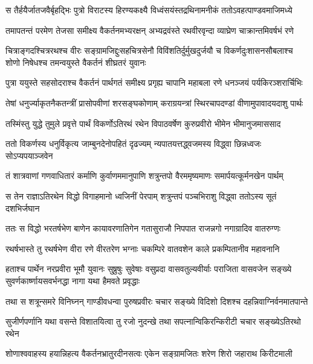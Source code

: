 
\twolineshloka
{स तैर्हयैर्जातजवैर्बृहद्भिः पुत्रो विराटस्य हिरण्यकक्ष्यै}
{विध्वंसयंस्तद्रथिनामनीकं ततोऽवहत्पाण्डवमाजिमध्ये}


\twolineshloka
{तमापतन्तं परमेण तेजसा समीक्ष्य वैकर्तनमभ्यरक्षन्}
{अभ्यद्रवंस्ते रथवीरवृन्दा व्याघ्रेण चाक्रान्तमिवर्षभं रणे}


\threelineshloka
{चित्राङ्गदश्चित्ररथश्च वीरः सङ्ग्रामजिद्दुःसहचित्रसेनौ}
{विविंशतिर्दुर्मुखदुर्जयौ च विकर्णदुःशासनसौबलाश्च}
{शोणो निषेधश्च तमन्वयुस्ते वैकर्तनं शीघ्रतरं युवानः}


\twolineshloka
{पुत्रा ययुस्ते सहसोदराश्च वैकर्तनं पार्थगतं समीक्ष्य}
{प्रगृह्य चापानि महाबला रणे धनञ्जयं पर्यकिरञ्शरार्चिभिः}


\twolineshloka
{तेषां धनुर्ज्याकृतनैकतन्त्रीं प्रासोपवीणां शरसङ्घकोणाम्}
{कराग्रयन्त्रां स्थिरचापदण्डां वीणामुपावादयदाशु पार्थः}


\twolineshloka
{तस्मिंस्तु युद्धे तुमुले प्रवृत्ते पार्थं विकर्णोऽतिरथं रथेन}
{विपाठवर्षेण कुरुप्रवीरो भीमेन भीमानुजमाससाद}


\twolineshloka
{ततो विकर्णस्य धनुर्विकृत्य जाम्बुनदेनोपहितं दृढज्यम्}
{न्यपातयत्तद्ध्वजमस्य विद्ध्वा छिन्नध्वजः सोऽप्यपयाञ्जवेन}


\twolineshloka
{तं शात्रवाणां गणवाधितारं कर्माणि कुर्वाणममानुपाणि}
{शत्रुन्तपो वैरममृष्यमाणः समार्पयत्कूर्मनखेन पार्थम्}


\twolineshloka
{स तेन राज्ञाऽतिरथेन विद्धो विगाहमानो ध्वजिनीं पेरपाम्}
{शत्रुन्तपं पञ्चभिराशु विद्ध्वा ततोऽस्य सूतं दशभिर्जघान}


\twolineshloka
{ततः स विद्धो भरतर्षभेण बाणेन कायावरणातिगेन}
{गतासुराजौ निपपात राजन्नगो नगाग्रादिव वातरुग्णः}


\twolineshloka
{रथर्षभास्ते तु रथर्षभेण वीरा रणे वीरतरेण भग्नाः}
{चकम्पिरे वातवशेन काले प्रकम्पितानीव महावनानि}


\threelineshloka
{हताश्च पार्थेन नरप्रवीरा भूमौ युवानः सुष्रुषुः सुवेषाः}
{वसुप्रदा वासवतुल्यवीर्याः पराजिता वासवजेन सङ्ख्ये}
{सुवर्णकार्ष्णायसवर्भनद्धा नागा यथा हैमवते प्रवृद्धाः}


\twolineshloka
{तथा स शत्रून्समरे विनिघ्नन् गाण्डीवधन्वा पुरुषप्रवीरः}
{चचार सङ्ख्ये विदिशो दिशश्च दहन्निवाग्निर्वनमातपान्ते}


\twolineshloka
{सुजीर्णपर्णानि यथा वसन्ते विशातयित्वा तु रजो नुदन्खे}
{तथा सपत्नान्विकिरन्किरीटी चचार सङ्ख्येऽतिरथो रथेन}


\twolineshloka
{शोणाश्ववाहस्य हयान्निहत्य वैकर्तनभ्रातुरदीनसत्वः}
{एकेन सङ्ग्रामजितः शरेण शिरो जहाराथ किरीटमाली}


